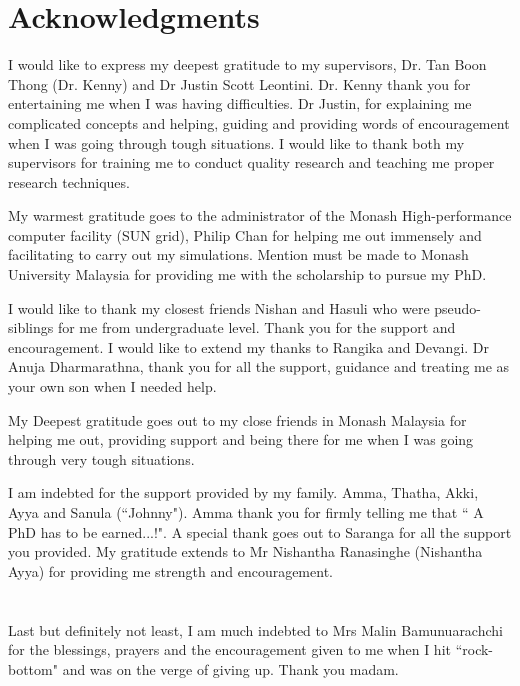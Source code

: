 \chapter*{Acknowledgments}

I would like to express my deepest gratitude to my supervisors, Dr. Tan Boon Thong (Dr. Kenny) and Dr Justin Scott Leontini. Dr. Kenny thank you for entertaining me when I was having difficulties. Dr Justin, for explaining me complicated concepts and helping, guiding and providing words of encouragement when I was going through tough situations. I would like to thank both my supervisors for training me to conduct quality research and teaching me proper research techniques.

My warmest gratitude goes to the administrator of the Monash High-performance computer facility (SUN grid), Philip Chan for helping me out immensely and facilitating to carry out my simulations. Mention must be made to Monash University Malaysia for providing me with the scholarship to pursue my PhD. 
 
I would like to thank my closest friends Nishan and Hasuli who were pseudo-siblings for me from undergraduate level. Thank you for the support and encouragement. I would like to extend my thanks to Rangika and Devangi. Dr Anuja Dharmarathna, thank you for all the support, guidance and treating me as your own son when I needed help.

My Deepest gratitude goes out to my close friends in Monash Malaysia for helping me out, providing support and being there for me when I was going through very tough situations. 

I am indebted for the support provided by my family. Amma, Thatha, Akki, Ayya and Sanula (``Johnny"). Amma thank you for firmly telling me that `` A PhD has to be earned...!". A special thank goes out to Saranga for all the support you provided. My gratitude extends to Mr Nishantha Ranasinghe (Nishantha Ayya) for providing me strength and encouragement.
\\
\\
\\
Last but definitely not least, I am much indebted to Mrs Malin Bamunuarachchi for the blessings, prayers and the encouragement given to me when I hit ``rock-bottom"  and was on the verge of giving up. Thank you madam.    

 

  

  